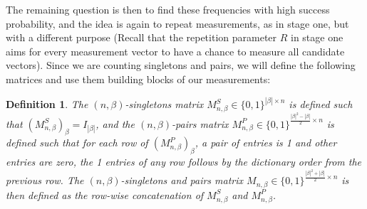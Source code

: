 \documentclass[10pt,a4paper]{amsart}
\newtheorem{definition}{Definition}[section]
\newtheorem{remark}{Remark}[section]
\begin{document}
The remaining question is then to find these frequencies with high success probability, and the idea is again to repeat measurements, as in stage one, but with a different purpose (Recall that the repetition parameter $R$ in stage one aims for every measurement vector to have a chance to measure all candidate vectors). Since we are counting singletons and pairs, we will define the following matrices and use them building blocks of our measurements:
\begin{definition}\label{def:nbspmatrix}
    The $(n,\beta)$-singletons matrix $M^S_{n,\beta}\in\{0,1\}^{|\beta|\times n}$ is defined such that $(M^S_{n,\beta})_\beta=I_{|\beta|}$, and the $(n,\beta)$-pairs matrix $M^P_{n,\beta}\in\{0,1\}^{\frac{|\beta|^2-|\beta|}{2}\times n}$ is defined such that for each row of $(M^P_{n,\beta})_\beta$, a pair of entries is 1 and other entries are zero, the 1 entries of any row follows by the dictionary order from the previous row. The $(n,\beta)$-singletons and pairs matrix $M_{n,\beta}\in\{0,1\}^{\frac{|\beta|^2+|\beta|}{2}\times n}$ is then defined as the row-wise concatenation of $M^S_{n,\beta}$ and $M^P_{n,\beta}$. 
\end{definition}
\end{document}
